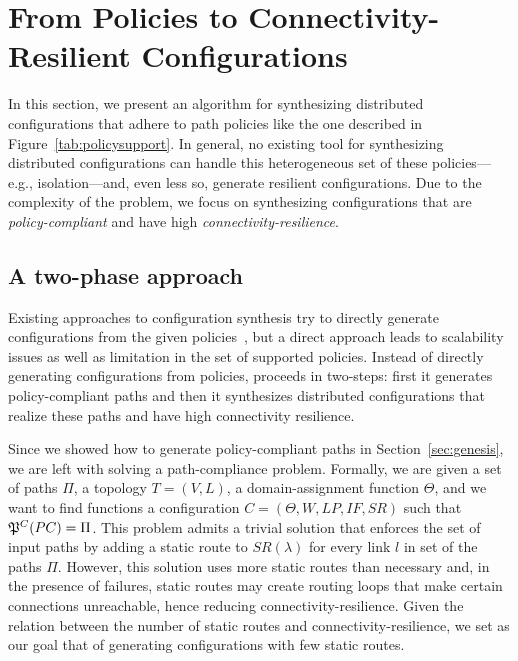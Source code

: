 \section{From Policies to Connectivity-Resilient  Configurations}
\label{sec:config-synthesis}

In this section, we present an algorithm
for synthesizing distributed configurations
that adhere to path policies like the one described 
in Figure~\ref{tab:policysupport}.
In general, no existing tool for synthesizing 
distributed configurations
can handle this heterogeneous set of 
these policies---e.g., isolation---and, even less so,
generate resilient configurations.
Due to the complexity of the problem, we focus on 
synthesizing  configurations that 
are \emph{policy-compliant} and have high \emph{connectivity-resilience}.



\subsection{A two-phase approach}
Existing approaches to configuration synthesis
try to directly generate configurations from the given policies~\cite{synet},
but a direct approach leads to scalability issues as well as limitation
in the set of supported policies.
Instead of directly generating configurations from policies, 
\name proceeds in two-steps:
first it generates policy-compliant paths
and then it synthesizes distributed configurations that realize these paths
and have high connectivity resilience.

Since we showed how to generate policy-compliant paths in Section~\ref{sec:genesis},
we are left with solving a path-compliance problem.
Formally, we are given a set of paths $\Pi$,
a topology $T=(V,L)$,
a domain-assignment function $\Theta$, 
and we want to find functions a configuration
$C=(\Theta,W,LP,IF,SR)$ such that
$\mathfrak{P}^C(PC) = \Pi$.
This problem admits a trivial solution that 
enforces the set of input paths
 by adding a 
static route to $SR(\lambda)$ for every link $l$ in 
set of the paths $\Pi$. 
However, this solution uses more static routes than necessary
and, in the presence of failures, static routes may
create routing loops that make certain connections 
unreachable, hence reducing connectivity-resilience.
Given the relation between the number of static 
routes and connectivity-resilience,
we set as our goal that of generating configurations 
with few static routes.

